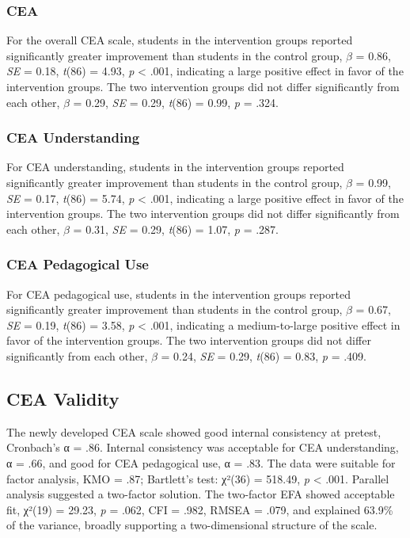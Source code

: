 \documentclass[
  letterpaper,
  DIV=11,
  numbers=noendperiod]{scrartcl}
\begin{document}
\subsubsection{CEA}\label{cea}

For the overall CEA scale, students in the intervention groups reported
significantly greater improvement than students in the control group,
\(\beta\) = 0.86, \emph{SE} = 0.18, \emph{t}(86) = 4.93, \emph{p}
\textless{} .001, indicating a large positive effect in favor of the
intervention groups. The two intervention groups did not differ
significantly from each other, \(\beta\) = 0.29, \emph{SE} = 0.29,
\emph{t}(86) = 0.99, \emph{p} = .324.

\subsubsection{CEA Understanding}\label{cea-understanding}

For CEA understanding, students in the intervention groups reported
significantly greater improvement than students in the control group,
\(\beta\) = 0.99, \emph{SE} = 0.17, \emph{t}(86) = 5.74, \emph{p}
\textless{} .001, indicating a large positive effect in favor of the
intervention groups. The two intervention groups did not differ
significantly from each other, \(\beta\) = 0.31, \emph{SE} = 0.29,
\emph{t}(86) = 1.07, \emph{p} = .287.

\subsubsection{CEA Pedagogical Use}\label{cea-pedagogical-use}

For CEA pedagogical use, students in the intervention groups reported
significantly greater improvement than students in the control group,
\(\beta\) = 0.67, \emph{SE} = 0.19, \emph{t}(86) = 3.58, \emph{p}
\textless{} .001, indicating a medium-to-large positive effect in favor
of the intervention groups. The two intervention groups did not differ
significantly from each other, \(\beta\) = 0.24, \emph{SE} = 0.29,
\emph{t}(86) = 0.83, \emph{p} = .409.

\subsection{CEA Validity}\label{cea-validity}

The newly developed CEA scale showed good internal consistency at
pretest, Cronbach's α = .86. Internal consistency was acceptable for CEA
understanding, α = .66, and good for CEA pedagogical use, α = .83. The
data were suitable for factor analysis, KMO = .87; Bartlett's test:
χ²(36) = 518.49, \emph{p} \textless{} .001. Parallel analysis suggested
a two-factor solution. The two-factor EFA showed acceptable fit, χ²(19)
= 29.23, \emph{p} = .062, CFI = .982, RMSEA = .079, and explained 63.9\%
of the variance, broadly supporting a two-dimensional structure of the
scale.
\end{document}
